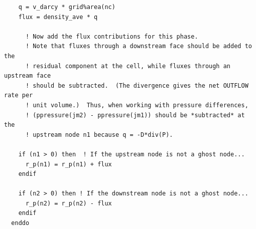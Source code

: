 \documentclass[12pt]{article}
\begin{document}
\begin{verbatim}
    q = v_darcy * grid%area(nc)
    flux = density_ave * q
    
      ! Now add the flux contributions for this phase.
      ! Note that fluxes through a downstream face should be added to the
      ! residual component at the cell, while fluxes through an upstream face 
      ! should be subtracted.  (The divergence gives the net OUTFLOW rate per
      ! unit volume.)  Thus, when working with pressure differences,
      ! (ppressure(jm2) - ppressure(jm1)) should be *subtracted* at the 
      ! upstream node n1 because q = -D*div(P).
    
    if (n1 > 0) then  ! If the upstream node is not a ghost node...
      r_p(n1) = r_p(n1) + flux
    endif

    if (n2 > 0) then ! If the downstream node is not a ghost node...
      r_p(n2) = r_p(n2) - flux
    endif
  enddo
  \end{verbatim}
\end{document}
